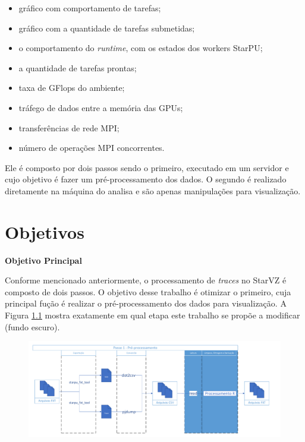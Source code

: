 \documentclass[prop-esp]{iiufrgs}
\begin{document}
\begin{itemize}
    \item gráfico com comportamento de tarefas;
    \item gráfico com a quantidade de tarefas submetidas;
    \item o comportamento do \emph{runtime}, com os estados dos workers StarPU;
    \item a quantidade de tarefas prontas;
    \item taxa de GFlops do ambiente;
    \item tráfego de dados entre a memória das GPUs;
    \item transferências de rede MPI;
    \item número de operações MPI concorrentes.
\end{itemize}

Ele é composto por dois passos sendo o primeiro, executado em um servidor e cujo objetivo é fazer um pré-processamento dos dados.
O segundo é realizado diretamente na máquina do analisa e são apenas manipulações para visualização.


%
\chapter{Objetivos}

\noindent \textbf{Objetivo Principal} 

Conforme mencionado anteriormente, o processamento de \emph{traces} no StarVZ é composto de dois passos. O objetivo desse trabalho é otimizar o primeiro, cuja principal fução é realizar o pré-processamento dos dados para visualização. A Figura \ref{fig:starvz-steps} mostra exatamente em qual etapa este trabalho se propõe a modificar (fundo escuro).

\begin{figure}[H]
 \centerline{\includegraphics[width=1\textwidth]{proposal/images/step1-simpler.pdf}}
 \label{fig:starvz-steps}
\end{figure}
\end{document}

